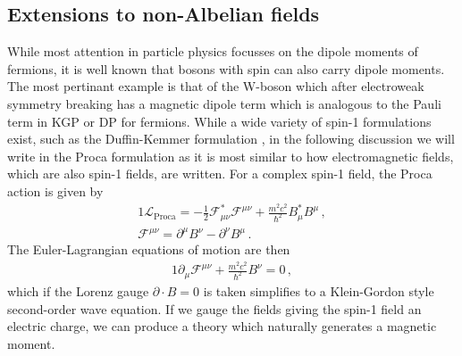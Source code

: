\subsection{Extensions to non-Albelian fields}
\label{sec:quarks}

While most attention in particle physics focusses on the dipole moments of fermions, it is well known that bosons with spin can also carry dipole moments. The most pertinant example is that of the W-boson which after electroweak symmetry breaking has a magnetic dipole term which is analogous to the Pauli term in KGP or DP for fermions. While a wide variety of spin-1 formulations exist, such as the Duffin-Kemmer formulation \ar, in the following discussion we will write in the Proca formulation as it is most similar to how electromagnetic fields, which are also spin-1 fields, are written. For a complex spin-1 field, the Proca action is given by
\begin{alignat}{1}
	\label{eq:proca:01a} \mathcal{L}_{\mathrm{Proca}} = -\frac{1}{2}\mathcal{F}_{\mu\nu}^{*}\mathcal{F}^{\mu\nu}+\frac{m^{2}c^{2}}{\hbar^{2}}B_{\mu}^{*}B^{\mu}\,,\\
	\label{eq:proca:01b} \mathcal{F}^{\mu\nu}=\partial^{\mu}B^{\nu}-\partial^{\nu}B^{\mu}\,.
\end{alignat}
The Euler-Lagrangian equations of motion are then
\begin{alignat}{1}
	\label{eq:proca:02a} \partial_{\mu}\mathcal{F}^{\mu\nu}+\frac{m^{2}c^{2}}{\hbar^{2}}B^{\nu}=0\,,
\end{alignat}
which if the Lorenz gauge $\partial\cdot B=0$ is taken simplifies to a Klein-Gordon style second-order wave equation. If we gauge the fields giving the spin-1 field an electric charge, we can produce a theory which naturally generates a magnetic moment.

